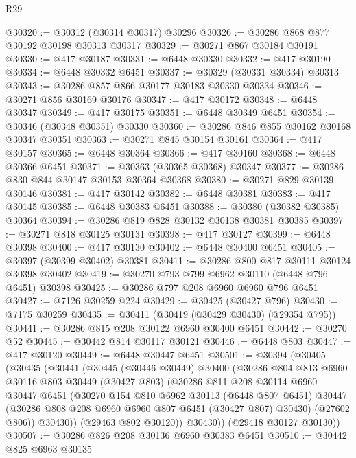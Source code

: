 \begin{lexlean}{R29}
\begin{coremodule}
@30320 := @30312 (@30314 @30317) @30296
@30326 := @30286 @868 @877 @30192 @30198 @30313 @30317
@30329 := @30271 @867 @30184 @30191
@30330 := @417 @30187
@30331 := @6448 @30330
@30332 := @417 @30190
@30334 := @6448 @30332 @6451
@30337 := @30329 (@30331 @30334) @30313
@30343 := @30286 @857 @866 @30177 @30183 @30330 @30334
@30346 := @30271 @856 @30169 @30176
@30347 := @417 @30172
@30348 := @6448 @30347
@30349 := @417 @30175
@30351 := @6448 @30349 @6451
@30354 := @30346 (@30348 @30351) @30330
@30360 := @30286 @846 @855 @30162 @30168 @30347 @30351
@30363 := @30271 @845 @30154 @30161
@30364 := @417 @30157
@30365 := @6448 @30364
@30366 := @417 @30160
@30368 := @6448 @30366 @6451
@30371 := @30363 (@30365 @30368) @30347
@30377 := @30286 @830 @844 @30147 @30153 @30364 @30368
@30380 := @30271 @829 @30139 @30146
@30381 := @417 @30142
@30382 := @6448 @30381
@30383 := @417 @30145
@30385 := @6448 @30383 @6451
@30388 := @30380 (@30382 @30385) @30364
@30394 := @30286 @819 @828 @30132 @30138 @30381 @30385
@30397 := @30271 @818 @30125 @30131
@30398 := @417 @30127
@30399 := @6448 @30398
@30400 := @417 @30130
@30402 := @6448 @30400 @6451
@30405 := @30397 (@30399 @30402) @30381
@30411 := @30286 @800 @817 @30111 @30124 @30398 @30402
@30419 := @30270 @793 @799 @6962 @30110 (@6448 @796 @6451) @30398
@30425 := @30286 @797 @208 @6960 @6960 @796 @6451
@30427 := @7126 @30259 @224
@30429 := @30425 (@30427 @796)
@30430 := @7175 @30259
@30435 := @30411 (@30419 (@30429 @30430) (@29354 @795))
@30441 := @30286 @815 @208 @30122 @6960 @30400 @6451
@30442 := @30270 @52
@30445 := @30442 @814 @30117 @30121
@30446 := @6448 @803
@30447 := @417 @30120
@30449 := @6448 @30447 @6451
@30501 := @30394
    (@30405
      (@30435
        (@30441
          (@30445
            (@30446 @30449)
            @30400
            (@30286
              @804
              @813
              @6960
              @30116
              @803
              @30449
              (@30427 @803)
              (@30286
                @811
                @208
                @30114
                @6960
                @30447
                @6451
                (@30270
                  @154
                  @810
                  @6962
                  @30113
                  (@6448 @807 @6451)
                  @30447
                  (@30286 @808 @208 @6960 @6960 @807 @6451 (@30427 @807) @30430)
                  (@27602 @806))
                @30430))
            (@29463 @802 @30120))
          @30430))
      (@29418 @30127 @30130))
@30507 := @30286 @826 @208 @30136 @6960 @30383 @6451
@30510 := @30442 @825 @6963 @30135

\end{coremodule}
\end{lexlean}

